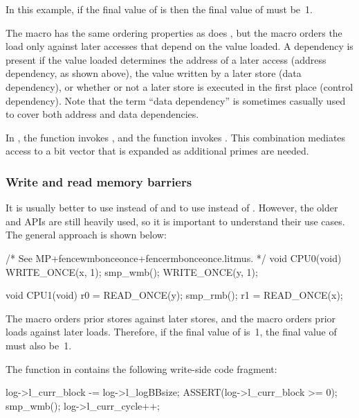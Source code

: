 In this example, if the final value of  is  then the final
value of  must be~1.

The  macro has the same ordering properties as does
, but the  macro orders the
load only against later accesses that depend on the value loaded.
A dependency is present if the value loaded determines the address of
a later access (address dependency, as shown above), the value written
by a later store (data dependency), or whether or not a later store is
executed in the first place (control dependency).
Note that the term ``data dependency'' is sometimes casually used to
cover both address and data dependencies.

In , the 
function invokes , and the 
function invokes .
This combination mediates access to a bit vector that is expanded as
additional primes are needed.


\subsubsection{Write and read memory barriers}

It is usually better to use  instead of 
and to use  instead of .
However, the older  and  APIs are still heavily
used, so it is important to understand their use cases.
The general approach is shown below:

\begin{VerbatimU}
	/* See MP+fencewmbonceonce+fencermbonceonce.litmus. */
	void CPU0(void)
	{
		WRITE_ONCE(x, 1);
		smp_wmb();
		WRITE_ONCE(y, 1);
	}

	void CPU1(void)
	{
		r0 = READ_ONCE(y);
		smp_rmb();
		r1 = READ_ONCE(x);
	}
\end{VerbatimU}

The  macro orders prior stores against later stores, and the
 macro orders prior loads against later loads.
Therefore, if the final value of  is~1, the final value of 
must also be~1.

The  function in 
contains the following write-side code fragment:

\begin{VerbatimU}
	log->l_curr_block -= log->l_logBBsize;
	ASSERT(log->l_curr_block >= 0);
	smp_wmb();
	log->l_curr_cycle++;
\end{VerbatimU}


